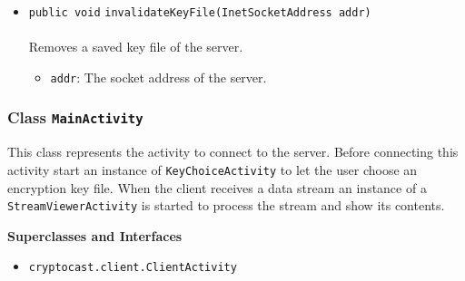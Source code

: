 \begin{itemize}
\item \lstinline|public void| \lstinline|invalidateKeyFile|\lstinline|(InetSocketAddress addr)|\\ \\[-0.6em]
Removes a saved key file of the server.
\begin{itemize}
\item \lstinline|addr|: The socket address of the server.
\end{itemize}



\end{itemize}

\subsubsection{Class \lstinline|MainActivity|}
This class represents the activity to connect to the server.
 Before connecting this activity start an instance of \lstinline|KeyChoiceActivity| to
 let the user choose an encryption key file. When the client receives a
 data stream an instance of a \lstinline|StreamViewerActivity| is started to process the
 stream and show its contents. \\
\noindent\begin{minipage}[t]{5cm}
\vspace{0.3em}
\hspace*{2em}
\vspace{0.3em}
\end{minipage}



\textbf{\sffamily Superclasses and Interfaces}
\begin{itemize}
\item \lstinline|cryptocast.client.ClientActivity|
\end{itemize}



